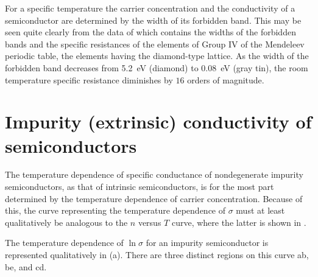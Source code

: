 For a specific temperature the carrier concentration and the conductivity of a semiconductor are determined by the width of its forbidden band. This may be seen quite clearly from the data of 
which contains the widths of the forbidden bands and the specific resistances of the elements of Group IV of the Mendeleev periodic table, the elements having the diamond-type lattice. As the width of the forbidden band decreases from \SI{5.2}{\electronvolt} (diamond) to \SI{0.08}{\electronvolt} (gray tin), the room temperature specific resistance diminishes by $16$ orders of magnitude.

\begin{table}[!b]
	\renewcommand{\arraystretch}{1.2}
	\caption{}
	\vspace{-0.6cm}
	\label{table:6_5}
	\begin{center}\end{center}
\end{table}

\section{Impurity (extrinsic) conductivity of semiconductors}\label{sec:57}

The temperature dependence of specific conductance of nondegenerate impurity semiconductors, as that of intrinsic semiconductors, is for the most part determined by the temperature dependence of carrier concentration. Because of this, the curve representing the temperature dependence of $\sigma$ must at least qualitatively be analogous to the $n$ versus $T$ curve, where the latter is shown in .

The temperature dependence of $\ln{\sigma}$ for an impurity semiconductor is represented qualitatively in (a). There are three distinct regions on this curve ab, be, and cd.

